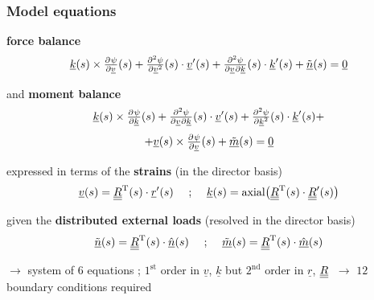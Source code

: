 \begin{frame}
  \frametitle{Model equations}
  
  \textbf{force balance}
  \begin{displaymath}
    \underline{k}(s) \times \pd{\psi}{\underline{v}}(s) +
    \pd[2]{\psi}{\underline{v}}(s) \cdot \underline{v}^{\prime}(s) +
    \md{\psi}{2}{\underline{v}}{}{\underline{k}}{}(s) \cdot \underline{k}^{\prime}(s) +
    \underline{\tilde{n}}(s) =
    \underline{0}
  \end{displaymath}
  
  \vspace{0.3em}
  and \textbf{moment balance}
  \begin{displaymath}
    \underline{k}(s) \times \pd{\psi}{\underline{k}}(s) +
    \md{\psi}{2}{\underline{v}}{}{\underline{k}}{}(s) \cdot \underline{v}^{\prime}(s) +
    \pd[2]{\psi}{\underline{k}}(s) \cdot \underline{k}^{\prime}(s) +
  \end{displaymath}
  \begin{displaymath}
    + \underline{v}(s) \times \pd{\psi}{\underline{v}}(s) +
    \underline{\tilde{m}}(s) =
    \underline{0}
  \end{displaymath}
  
  \vspace{0.3em}
  expressed in terms of the \textbf{strains} (in the director basis)
  \begin{displaymath}
    \underline{v}(s) =
    \underline{\underline{R}}^{\mathrm{T}}(s) \cdot \underline{r}^{\prime}(s)
    \quad \text{ ; } \quad
    \underline{k}(s) =
    \mathrm{axial} \bigl(
    \underline{\underline{R}}^{\mathrm{T}}(s) \cdot \underline{\underline{R}}^{\prime}(s)
    \bigr)
  \end{displaymath}
  
  \vspace{0.3em}
  given the \textbf{distributed external loads} (resolved in the director basis)
  \begin{displaymath}
    \underline{\tilde{n}}(s) =
    \underline{\underline{R}}^{\mathrm{T}}(s) \cdot \underline{\hat{n}}(s)
    \quad \text{ ; } \quad
    \underline{\tilde{m}}(s) =
    \underline{\underline{R}}^{\mathrm{T}}(s) \cdot \underline{\hat{m}}(s)
  \end{displaymath}
  
  \vspace{0.2em}
  $\rightarrow$ system of $6$ equations ;
  $1^{\text{st}}$ order in $\underline{v}$, $\underline{k}$
  but $2^{\text{nd}}$ order in $\underline{r}$, $\underline{\underline{R}}$ \newline
  $\: \rightarrow$ $12$ boundary conditions required
\end{frame}

